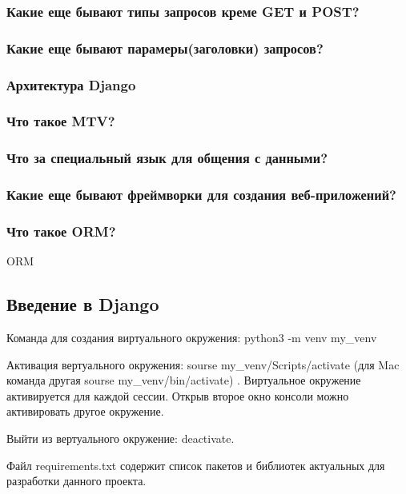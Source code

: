 \documentclass[%
	11pt,
	a4paper,
	utf8,
		]{article}
\begin{document}
\subsubsection{Какие еще бывают типы запросов креме GET и POST?}

\subsubsection{Какие еще бывают парамеры(заголовки) запросов?}

\subsubsection{Архитектура Django}

\subsubsection{Что такое MTV?}

\subsubsection{Что за специальный язык для общения с данными?}

\subsubsection{Какие еще бывают фреймворки для создания веб-приложений?}

\subsubsection{Что такое ORM?}

ORM


\subsection{Введение в Django}

Команда для создания виртуального окружения: python3 -m venv my_venv

Активация вертуального окружения: sourse my_venv/Scripts/activate (для Mac команда другая  sourse my_venv/bin/activate) . Виртуальное окружение активируется для каждой сессии. Открыв второе окно консоли можно активировать другое окружение.

Выйти из вертуального окружение: deactivate.

Файл requirements.txt содержит список пакетов и библиотек актуальных для разработки данного проекта. 
\end{document}
